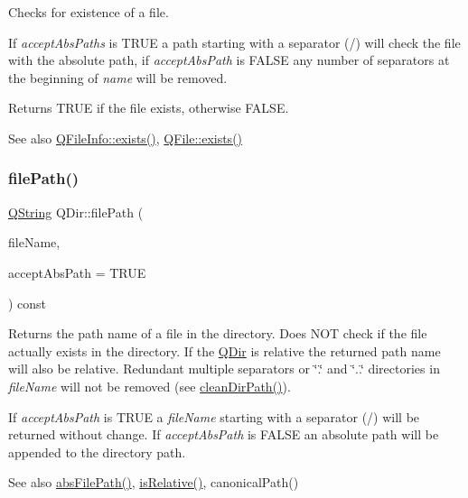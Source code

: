 Checks for existence of a file.

If {\itshape accept\+Abs\+Paths} is T\+R\+UE a path starting with a separator (\textquotesingle{}/\textquotesingle{}) will check the file with the absolute path, if {\itshape accept\+Abs\+Path} is F\+A\+L\+SE any number of separators at the beginning of {\itshape name} will be removed.

Returns T\+R\+UE if the file exists, otherwise F\+A\+L\+SE.

\begin{DoxySeeAlso}{See also}
\mbox{\hyperlink{class_q_file_info_af7a247c24ea455875293d6406db652a4}{Q\+File\+Info\+::exists()}}, \mbox{\hyperlink{class_q_file_ad3329694f62a9bb5730f6ba709f8b7cc}{Q\+File\+::exists()}} 
\end{DoxySeeAlso}
\mbox{\label{class_q_dir_a5210a2a0b20d77d2d9ab29e7631310e6}} 
\subsubsection{\texorpdfstring{filePath()}{filePath()}}
{\footnotesize\ttfamily \mbox{\hyperlink{class_q_string}{Q\+String}} Q\+Dir\+::file\+Path (\begin{DoxyParamCaption}\item[{const \mbox{\hyperlink{class_q_string}{Q\+String}} \&}]{file\+Name,  }\item[{bool}]{accept\+Abs\+Path = {\ttfamily TRUE} }\end{DoxyParamCaption}) const\hspace{0.3cm}{\ttfamily [virtual]}}

Returns the path name of a file in the directory. Does N\+OT check if the file actually exists in the directory. If the \mbox{\hyperlink{class_q_dir}{Q\+Dir}} is relative the returned path name will also be relative. Redundant multiple separators or \char`\"{}.\char`\"{} and \char`\"{}..\char`\"{} directories in {\itshape file\+Name} will not be removed (see \mbox{\hyperlink{class_q_dir_ad38037708dc754f5bdd877c145dbbb19}{clean\+Dir\+Path()}}).

If {\itshape accept\+Abs\+Path} is T\+R\+UE a {\itshape file\+Name} starting with a separator (\textquotesingle{}/\textquotesingle{}) will be returned without change. If {\itshape accept\+Abs\+Path} is F\+A\+L\+SE an absolute path will be appended to the directory path.

\begin{DoxySeeAlso}{See also}
\mbox{\hyperlink{class_q_dir_aca84b0a728bc2b88c3ab55cbed6e18c4}{abs\+File\+Path()}}, \mbox{\hyperlink{class_q_dir_a2b420c4c2e7b5764ab1fb35e37d1726f}{is\+Relative()}}, canonical\+Path() 
\end{DoxySeeAlso}
\mbox{\label{class_q_dir_a55b8ed62e97891ffc50d0c4a2b8fe31d}} 

